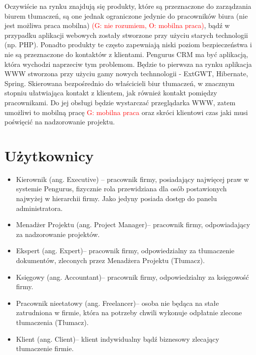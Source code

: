 \documentclass[licencjacka]{pracamgr}
\begin{document}
Oczywiście na rynku znajdują się produkty, które są przeznaczone do zarządzania biurem tłumaczeń, 
są one jednak ograniczone jedynie do pracowników biura (nie jest możliwa praca mobilna) \textcolor{red}{(G: nie rozumiem, O: mobilna praca)}, 
bądź w przypadku aplikacji webowych zostały stworzone przy użyciu starych technologii (np. PHP). 
Ponadto produkty te często zapewniają niski poziom bezpieczeństwa i nie są przeznaczone do kontaktów z klientami.
Pengurus CRM ma być aplikacją, która wychodzi naprzeciw tym problemom. 
Będzie to pierwsza na rynku aplikacja WWW stworzona przy użyciu gamy nowych technnologii - ExtGWT, Hibernate, Spring.
Skierowana bezpośrednio do właścicieli biur tłumaczeń, w znacznym stopniu ułatwiająca kontakt z klientem, jak również kontakt pomiędzy pracownikami. 
Do jej obsługi będzie wystarczać przeglądarka WWW, zatem umożliwi to mobilną pracę \textcolor{red}{G: mobilna praca} 
oraz skróci klientowi czas jaki musi poświęcić na nadzorowanie projektu. 

\section{Użytkownicy}
\begin{itemize}
\item Kierownik (ang. Executive) – pracownik firmy, posiadający najwięcej praw w systemie Pengurus, fizycznie rola przewidziana dla osób postawionych najwyżej w hierarchii firmy. Jako jedyny posiada dostęp do panelu administratora.
\item Menadżer Projektu (ang. Project Manager)– pracownik firmy, odpowiadający za nadzorowanie projektów.
\item Ekspert (ang. Expert)– pracownik firmy, odpowiedzialny za tłumaczenie dokumentów, zleconych przez Menadżera Projektu (Tłumacz).
\item Księgowy (ang. Accountant)– pracownik firmy, odpowiedzialny za księgowość firmy.
\item Pracownik nieetatowy (ang. Freelancer)– osoba nie będąca na stałe zatrudniona w firmie, która na potrzeby chwili wykonuje odpłatnie zlecone tłumaczenia (Tłumacz).
\item Klient (ang. Client)– klient indywidualny bądź biznesowy zlecający tłumaczenie firmie.
\end{itemize}
\end{document}
